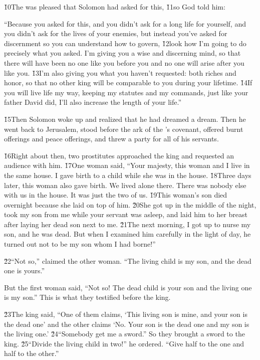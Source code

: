 \v{10}The  was pleased that Solomon had asked for this, \v{11}so God told him:

\begin{poetry}
\poeml ``Because you asked for this, and you didn't ask for a long life for yourself, and you didn't ask for the lives of your enemies, but instead you've asked for discernment so you can understand how to govern, \v{12}look how I'm going to do precisely what you asked. I'm giving you a wise and discerning mind, so that there will have been no one like you before you and no one will arise after you like you. \v{13}I'm also giving you what you haven't requested: both riches and honor, so that no other king will be comparable to you during your lifetime. \v{14}If you will live life my way, keeping my statutes and my commands, just like your father David did, I'll also increase the length of your life.''
\end{poetry}

\v{15}Then Solomon woke up and realized that he had dreamed a dream. Then he went back to Jerusalem, stood before the ark of the 's covenant, offered burnt offerings and peace offerings, and threw a party for all of his servants.

\v{16}Right about then, two prostitutes approached the king and requested an audience with him. \v{17}One woman said, ``Your majesty, this woman and I live in the same house. I gave birth to a child while she was in the house. \v{18}Three days later, this woman also gave birth. We lived alone there. There was nobody else with us in the house. It was just the two of us. \v{19}This woman's son died overnight because she laid on top of him. \v{20}She got up in the middle of the night, took my son from me while your servant was asleep, and laid him to her breast after laying her dead son next to me. \v{21}The next morning, I got up to nurse my son, and he was dead. But when I examined him carefully in the light of day, he turned out not to be my son whom I had borne!''

\v{22}``Not so,'' claimed the other woman. ``The living child is my son, and the dead one is yours.''

But the first woman said, ``Not so! The dead child is your son and the living one is my son.'' This is what they testified before the king.

\v{23}The king said, ``One of them claims, `This living son is mine, and your son is the dead one' and the other claims `No. Your son is the dead one and my son is the living one.' \v{24}``Somebody get me a sword.'' So they brought a sword to the king. \v{25}``Divide the living child in two!'' he ordered. ``Give half to the one and half to the other.''


